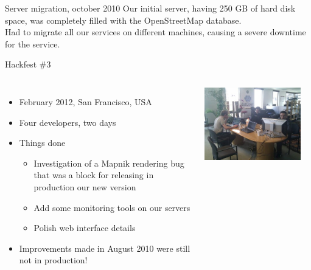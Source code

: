 \documentclass{beamer}
\begin{document}
\begin{frame}{Server migration, october 2010}
  Our initial server, having 250 GB of hard disk space, was completely
  filled with the OpenStreetMap database.\\

  Had to migrate all our services on different machines, causing a
  severe downtime for the service.
\end{frame}

\begin{frame}{Hackfest \#3}
  \begin{columns}
  \begin{itemize}
  \item February 2012, San Francisco, USA
  \item Four developers, two days
  \item Things done
    \begin{itemize}
    \item Investigation of a Mapnik rendering bug that was a block for
      releasing in production our new version
    \item Add some monitoring tools on our servers
    \item Polish web interface details
    \end{itemize}
  \item Improvements made in August 2010 were still not in production!
  \end{itemize}
  \includegraphics[width=0.9\textwidth]{hackfest-3.jpg}
  \end{columns}
\end{frame}
\end{document}
